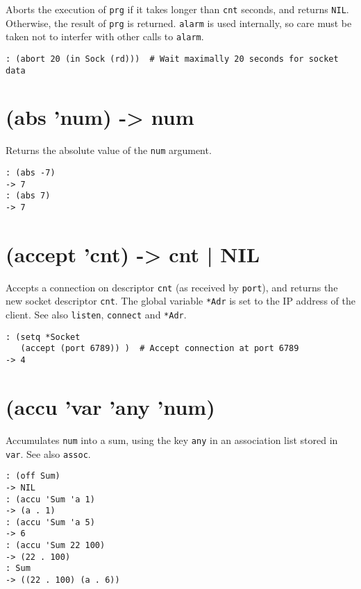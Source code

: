 Aborts the execution of \texttt{prg} if it takes longer than \texttt{cnt} seconds, and
returns \texttt{NIL}. Otherwise, the result of \texttt{prg} is returned. \texttt{alarm} is
used internally, so care must be taken not to interfer with other calls
to \texttt{alarm}.


\begin{verbatim}
: (abort 20 (in Sock (rd)))  # Wait maximally 20 seconds for socket data
\end{verbatim}

 
\section{(abs 'num) -> num}
\label{sec-8-1-1-8}


Returns the absolute value of the \texttt{num} argument.


\begin{verbatim}
: (abs -7)
-> 7
: (abs 7)
-> 7
\end{verbatim}

 
\section{(accept 'cnt) -> cnt | NIL}
\label{sec-8-1-1-9}


Accepts a connection on descriptor \texttt{cnt} (as received by \texttt{port}), and
returns the new socket descriptor \texttt{cnt}. The global variable \texttt{*Adr} is
set to the IP address of the client. See also \texttt{listen}, \texttt{connect} and
\texttt{*Adr}.


\begin{verbatim}
: (setq *Socket
   (accept (port 6789)) )  # Accept connection at port 6789
-> 4
\end{verbatim}

 
\section{(accu 'var 'any 'num)}
\label{sec-8-1-1-10}


Accumulates \texttt{num} into a sum, using the key \texttt{any} in an association list
stored in \texttt{var}. See also \texttt{assoc}.


\begin{verbatim}
: (off Sum)
-> NIL
: (accu 'Sum 'a 1)
-> (a . 1)
: (accu 'Sum 'a 5)
-> 6
: (accu 'Sum 22 100)
-> (22 . 100)
: Sum
-> ((22 . 100) (a . 6))
\end{verbatim}


